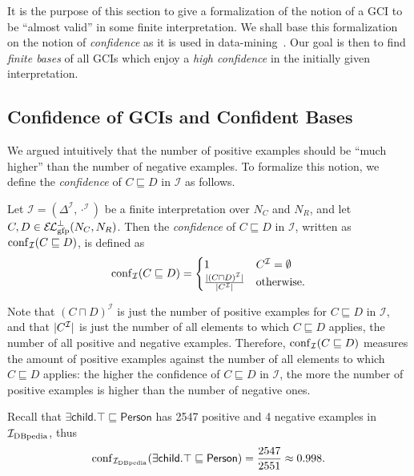 It is the purpose of this section to give a formalization of the notion of a GCI to be
\enquote{almost valid} in some finite interpretation.  We shall base this formalization on
the notion of \emph{confidence} as it is used in
data-mining~\cite{arules:agrawal:association-rules}.  Our goal is then to find
\emph{finite bases} of all GCIs which enjoy a \emph{high confidence} in the initially
given interpretation.

\subsection{Confidence of GCIs and Confident Bases}
\label{sec:conf-gcis-conf}

We argued intuitively that the number of positive examples should be \enquote{much higher}
than the number of negative examples.  To formalize this notion, we define the
\emph{confidence} of $C \sqsubseteq D$ in $\mathcal{I}$ as follows.

\begin{Definition}
  \label{def:gci-confidence}
  Let $\mathcal{I} = (\Delta^{\mathcal{I}}, \cdot^{\mathcal{I}})$ be a finite
  interpretation over $N_C$ and $N_R$, and let $C, D \in \ELgfpbot(N_C, N_R)$.  Then the
  \emph{confidence} of $C \sqsubseteq D$ in $\mathcal{I}$, written as
  $\operatorname{conf}_{\mathcal{I}}(C \sqsubseteq D)$, is defined as
  \begin{equation*}
    \operatorname{conf}_{\mathcal{I}}( C \sqsubseteq D ) =
    \begin{cases}
      1 & C^{\mathcal{I}} = \emptyset \\
      \frac{\lvert (C \sqcap D)^{\mathcal{I}} \rvert}{\lvert C^{\mathcal{I}} \rvert} & \text{otherwise.}
    \end{cases}
  \end{equation*}
\end{Definition}
Note that $(C \sqcap D)^{\mathcal{I}}$ is just the number of positive examples for $C
\sqsubseteq D$ in $\mathcal{I}$, and that $\lvert C^{\mathcal{I}}\rvert$ is just the number of
all elements to which $C \sqsubseteq D$ applies, \ie the number of all positive and
negative examples.  Therefore, $\operatorname{conf}_{\mathcal{I}}(C \sqsubseteq D)$ measures the amount
of positive examples against the number of all elements to which $C \sqsubseteq D$
applies: the higher the confidence of $C \sqsubseteq D$ in $\mathcal{I}$, the more the
number of positive examples is higher than the number of negative ones.

\begin{Example}
  \label{expl:Idbpedia-confidence}
  Recall that $\mathsf{\exists child. \top \sqsubseteq Person}$ has 2547 positive and 4
  negative examples in ${\mathcal{I}_{\text{DBpedia}}}$, thus
  \begin{equation*}
    \operatorname{conf}_{\mathcal{I}_{\text{DBpedia}}}( {\mathsf{\exists child. \top \sqsubseteq Person} } ) = \frac{ 2547 }{
      2551 } \approx 0.998.
  \end{equation*}
\end{Example}

